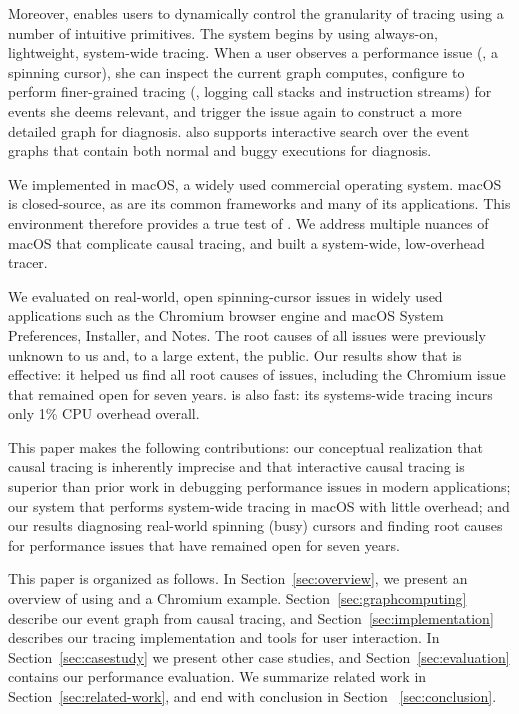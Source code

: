 Moreover, \xxx enables users to dynamically control the granularity of tracing
using a number of intuitive primitives. The system begins by using always-on,
lightweight, system-wide tracing.  When a user observes a performance issue
(\eg, a spinning cursor), she can inspect the current graph \xxx computes,
configure \xxx to perform finer-grained tracing (\eg, logging call stacks and
instruction streams) for events she deems relevant, and trigger the issue again
to construct a more detailed graph for diagnosis.  \xxx also supports
interactive search over the event graphs that contain both normal and buggy
executions for diagnosis.

We implemented \xxx in macOS, a widely used commercial operating system. macOS
is closed-source, as are its common frameworks and many of its applications.
This environment therefore provides a true test of \xxx.  We address multiple
nuances of macOS that complicate causal tracing, and built a system-wide,
low-overhead tracer.

We evaluated \xxx on \nbug real-world, open spinning-cursor issues in widely
used applications such as the Chromium browser engine and macOS System
Preferences, Installer, and Notes.  The root causes of all \nbug issues were
previously unknown to us and, to a large extent, the public. Our results show
that \xxx is effective: it helped us find all root causes of issues, including
the Chromium issue that remained open for seven years.  \xxx is also fast: its
systems-wide tracing incurs only 1\% CPU overhead overall.

This paper makes the following contributions: our conceptual realization that
causal tracing is inherently imprecise and that interactive causal tracing is
superior than prior work in debugging performance issues in modern
applications; our system \xxx that performs system-wide tracing in macOS with
little overhead; and our results diagnosing real-world spinning (busy) cursors
and finding root causes for performance issues that have remained open for
seven years.

This paper is organized as follows. In Section~\ref{sec:overview}, we present
an overview of using \xxx and a Chromium example.
Section~\ref{sec:graphcomputing} describe our event graph from causal tracing,
and Section~\ref{sec:implementation} describes our
tracing implementation and tools for user interaction.
In Section~\ref{sec:casestudy} we present other case
studies, and Section~\ref{sec:evaluation} contains our performance evaluation.
We summarize related work in Section~\ref{sec:related-work}, and end with
conclusion in Section ~\ref{sec:conclusion}.

